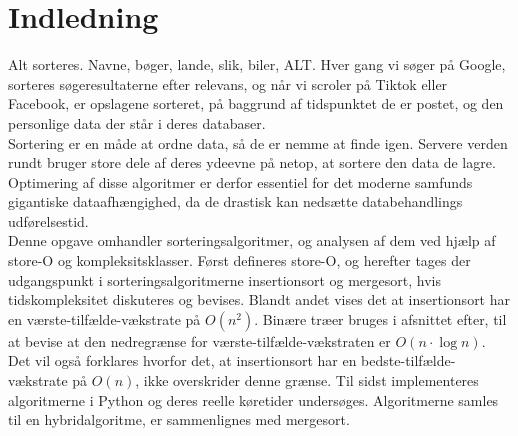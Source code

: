 \chapter*{Indledning}
\label{ch:Indledning}

Alt sorteres. Navne, bøger, lande, slik, biler, ALT. Hver gang vi søger på Google, sorteres søgeresultaterne efter relevans, og når vi scroler på Tiktok eller Facebook, er opslagene sorteret, på baggrund af tidspunktet de er postet, og den personlige data der står i deres databaser.\\

Sortering er en måde at ordne data, så de er nemme at finde igen. Servere verden rundt bruger store dele af deres ydeevne på netop, at sortere den data de lagre. Optimering af disse algoritmer er derfor essentiel for det moderne samfunds gigantiske dataafhængighed, da de drastisk kan nedsætte databehandlings udførelsestid.\\

Denne opgave omhandler sorteringsalgoritmer, og analysen af dem ved hjælp af store-O og kompleksitsklasser. Først defineres store-O, og herefter tages der udgangspunkt i sorteringsalgoritmerne insertionsort og mergesort, hvis tidskompleksitet diskuteres og bevises. Blandt andet vises det at insertionsort har en værste-tilfælde-vækstrate på $O(n^2)$. Binære træer bruges i afsnittet efter, til at bevise at den nedregrænse for værste-tilfælde-vækstraten er $O(n \cdot \log n)$. Det vil også forklares hvorfor det, at insertionsort har en bedste-tilfælde-vækstrate på $O(n)$, ikke overskrider denne grænse. Til sidst implementeres algoritmerne i Python og deres reelle køretider undersøges. Algoritmerne samles til en hybridalgoritme, er sammenlignes med mergesort.
